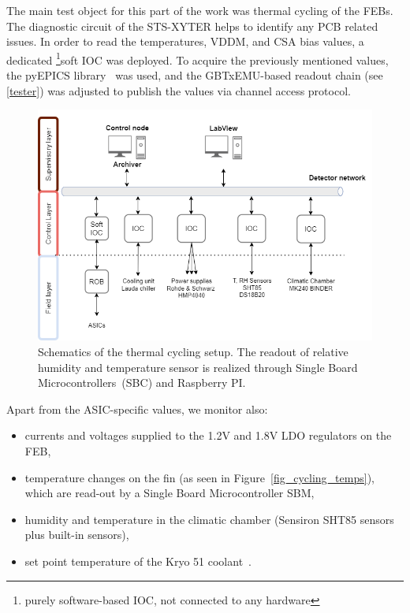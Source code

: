 The main test object for this part of the work was thermal cycling of the \gls{FEB}s. The diagnostic circuit of the STS-XYTER helps to identify any \gls{PCB} related issues. In order to read the temperatures, VDDM, and  \gls{CSA} bias values, a dedicated \footnote{purely software-based \gls{IOC}, not connected to any hardware}{soft IOC} was deployed. To acquire the previously mentioned values, the pyEPICS library~\cite{pyEPICS} was used, and the GBTxEMU-based readout chain (see \autoref{tester}) was adjusted to publish the values via channel access protocol. 
\begin{figure}[!h]
\centering
\includegraphics[width=0.85\columnwidth]{Chapter4/images/cycling_scheme.png}
\caption{Schematics of the thermal cycling setup. The readout of relative humidity and temperature sensor is realized through Single Board Microcontrollers~(\gls{SBC}) and Raspberry PI.}
\label{fig_setup}
\end{figure}
Apart from the \gls{ASIC}-specific values, we monitor also:
\begin{itemize}
    \item currents and voltages supplied to the 1.2V and 1.8V \gls{LDO} regulators on the \gls{FEB}, 
    \item temperature changes on the fin (as seen in Figure~\ref{fig_cycling_temps}), which are read-out by a Single Board Microcontroller \gls{SBM},
    \item humidity and temperature in the climatic chamber (Sensiron SHT85 sensors plus built-in sensors),
    \item set point temperature of the Kryo 51 coolant~\cite{KRYO}.
\end{itemize}

